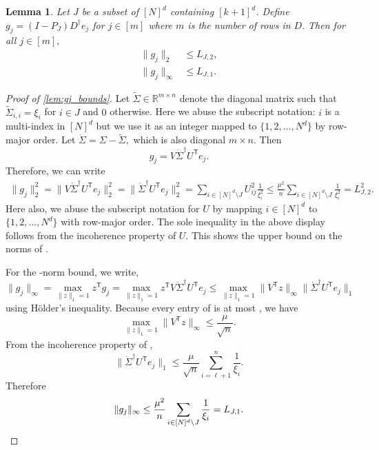 \documentclass[ejs,noshowframe]{imsart}
\theoremstyle{plain}
\newtheorem{lemma}[theorem]{Lemma}
\theoremstyle{definition}
\newcommand{\R}{\mathbb{R}}
\renewcommand{\top}{\mathsf{T}}
\renewcommand{\tilde}{\widetilde}
\begin{document}
\begin{appendix}
\begin{lemma}
\label{lem:gj_bounds}
Let $J$ be a subset of $[N]^d$ containing $[k+1]^d$.  
Define $g_j = (I-P_{J}) D^\dagger e_j$ for $j\in[m]$ 
 where $m$ is the number of rows in $D.$ Then for all $j\in [m],$
\begin{align}
\|g_j \|_2 &\leq L_{J,2}, \\
\|g_j \|_\infty &\leq L_{J,1}.
\end{align}
\end{lemma}
\begin{proof}[Proof of \autoref{lem:gj_bounds}]
Let $\tilde \Sigma \in \R^{m\times n}$ denote the diagonal matrix such that 
$\tilde \Sigma _{i,i} = \xi_i$ for $i \in J$ and $0$ otherwise. 
Here we abuse the subscript notation: $i$ is a multi-index in $[N]^d$ but we 
use it as an integer mapped to $\{ 1, 2, \dots, N^d\}$ by row-major order.
Let $\dot \Sigma = \Sigma - \tilde \Sigma,$ which is also diagonal $m\times n$. 
Then 
\[
g_j = V \dot \Sigma^\dagger U^\top e_j.
\]
Therefore, we can write 
\begin{align}
\|g_j\|_2^2
= \| V \dot \Sigma^\dagger U^\top e_j \|_2^2
= \| \dot \Sigma^\dagger U^\top e_j \|_2^2
= \sum_{i \in [N]^d \setminus J} U_{ij}^2 \frac{1}{\xi_i^2} 
\leq \frac{\mu^2}{n} \sum_{i \in [N]^d \setminus J} \frac{1}{\xi_i^2} 
=  L_{J,2}^2.
\end{align}
Here also, we abuse the subscript notation for $U$ by mapping $i\in [N]^d$ to 
$\{1,2,\dots,N^d\}$ with row-major order.
The sole inequality in the above display follows from the incoherence property 
of $U$. This shows the upper bound on the  norms of 
.

For the \smash{$\ell_\infty$}-norm bound, we write,
\begin{equation}
\|g_j\|_\infty = \max_{\|z\|_1 = 1} z^\top g_j
= \max_{\|z\|_1 = 1} z^\top V \dot \Sigma^\dagger U^\top e_j
\leq  \max_{\|z\|_1 = 1} \| V^\top z \|_\infty \| \dot \Sigma^\dagger U^\top 
e_j \|_1
\end{equation}
using H\"older's inequality. Because every entry of  is at most 
, we have
\begin{equation}
\max_{\|z\|_1 = 1} \| V^\top z \|_\infty \leq \frac{\mu}{\sqrt{n}}.
\end{equation}
From the incoherence property of ,
\begin{equation*}
\| \dot \Sigma^\dagger U^\top e_j \|_1
\leq \frac{\mu}{\sqrt{n}} \sum_{i=\ell+1}^n \frac{1}{\xi_i}.
\end{equation*}
Therefore
\begin{equation*}
\|g_j\|_\infty 
\leq 
\frac{\mu^2}{n} \sum_{i \in [N]^d \setminus J} \frac{1}{\xi_i}  =
L_{J,1}.\hfill\qedhere
\end{equation*}
\end{proof}


\end{appendix}
\end{document}
